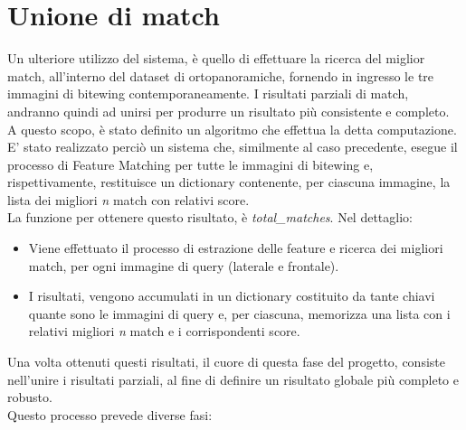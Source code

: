 \documentclass[12pt,a4paper,openright,twoside]{book}
\begin{document}
\chapter{Unione di match}
Un ulteriore utilizzo del sistema, è quello di effettuare la ricerca del miglior match, all'interno del dataset di ortopanoramiche, fornendo in ingresso le tre immagini di bitewing contemporaneamente. I risultati parziali di match, andranno quindi ad unirsi per produrre un risultato più consistente e completo.\\
A questo scopo, è stato definito un algoritmo che effettua la detta computazione.\\
E' stato realizzato perciò un sistema che, similmente al caso precedente, esegue il processo di Feature Matching per tutte le immagini di bitewing e, rispettivamente, restituisce un dictionary contenente, per ciascuna immagine, la lista dei migliori {\itshape n} match con relativi score.\\
La funzione per ottenere questo risultato, è {\itshape total\_matches}. Nel dettaglio:
\begin{itemize}
\item Viene effettuato il processo di estrazione delle feature e ricerca dei migliori match, per ogni immagine di query (laterale e frontale).
\item I risultati, vengono accumulati in un dictionary costituito da tante chiavi quante sono le immagini di query e, per ciascuna, memorizza una lista con i relativi migliori {\itshape n} match e i corrispondenti score.
\end{itemize}
Una volta ottenuti questi risultati, il cuore di questa fase del progetto, consiste nell'unire i risultati parziali, al fine di definire un risultato globale più completo e robusto.\\
Questo processo prevede diverse fasi:
\end{document}
